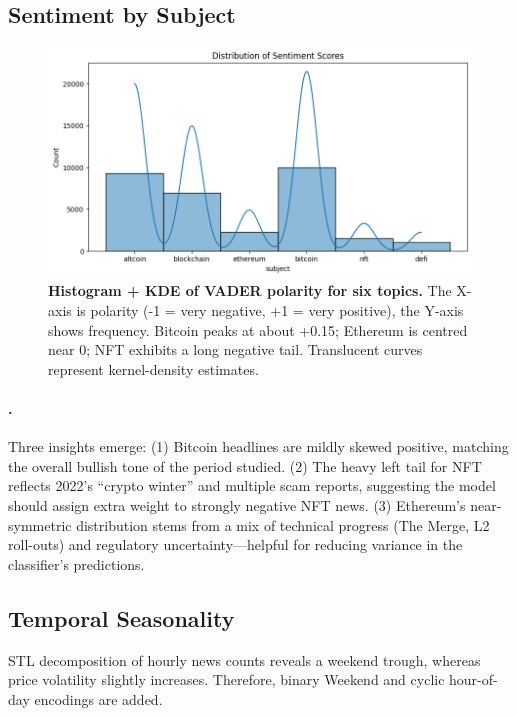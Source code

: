 \documentclass[12pt,a4paper]{article}
\begin{document}
\subsection{Sentiment by Subject}
\begin{figure}[H]
  \centering
  \includegraphics[width=.9\linewidth]{output2.png}
  \caption{\textbf{Histogram + KDE of VADER polarity for six topics.}  
  The X-axis is polarity (-1 = very negative, +1 = very positive),
  the Y-axis shows frequency. Bitcoin peaks at about +0.15; Ethereum
  is centred near 0; NFT exhibits a long negative tail. Translucent curves represent kernel-density estimates.}
  \label{fig:sentiment}
\end{figure}


\paragraph{.}
Three insights emerge:  
(1) Bitcoin headlines are mildly skewed positive, matching the overall
bullish tone of the period studied.  
(2) The heavy left tail for NFT reflects 2022’s “crypto winter” and
multiple scam reports, suggesting the model should assign extra weight
to strongly negative NFT news.  
(3) Ethereum’s near-symmetric distribution stems from a mix of
technical progress (The Merge, L2 roll-outs) and regulatory
uncertainty—helpful for reducing variance in the classifier’s
predictions.


\subsection{Temporal Seasonality}
STL decomposition of hourly news counts reveals a weekend trough,
whereas price volatility slightly increases.  Therefore, binary
\textsf{Weekend} and cyclic hour-of-day encodings are added.

\end{document}
